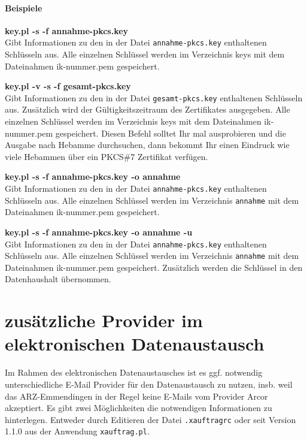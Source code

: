 \paragraph{Beispiele}
\begin{compactdesc}
\item
\textbf{key.pl -s -f annahme-pkcs.key}\\
Gibt Informationen zu den in der Datei \verb|annahme-pkcs.key| enthaltenen
Schlüsseln aus. Alle einzelnen Schlüssel werden im Verzeichnis keys mit
dem Dateinahmen ik-nummer.pem gespeichert.
\item
\textbf{key.pl -v -s -f gesamt-pkcs.key}\\
Gibt Informationen zu den in der Datei \verb|gesamt-pkcs.key| enthaltenen
Schlüsseln aus. Zusätzlich wird der Gültigkeitszeitraum des Zertifikates
ausgegeben. Alle einzelnen Schlüssel werden im Verzeichnis keys mit
dem Dateinahmen ik-nummer.pem gespeichert.
Diesen Befehl solltet Ihr mal ausprobieren und die Ausgabe nach Hebamme
durchsuchen, dann bekommt Ihr einen Eindruck wie viele Hebammen über ein
PKCS\#7 Zertifikat verfügen.
\item
\textbf{key.pl -s -f annahme-pkcs.key -o annahme}\\
Gibt Informationen zu den in der Datei \verb|annahme-pkcs.key| enthaltenen
Schlüsseln aus. Alle einzelnen Schlüssel werden im Verzeichnis \verb|annahme|
 mit dem Dateinahmen ik-nummer.pem gespeichert.
\item
\textbf{key.pl -s -f annahme-pkcs.key -o annahme -u}\\
Gibt Informationen zu den in der Datei \verb|annahme-pkcs.key| enthaltenen
Schlüsseln aus. Alle einzelnen Schlüssel werden im Verzeichnis \verb|annahme|
 mit dem Dateinahmen ik-nummer.pem gespeichert. Zusätzlich werden die
Schlüssel in den \tinyHeb\/ Datenhaushalt übernommen. 
\end{compactdesc}


\section{zusätzliche Provider im elektronischen Datenaustausch\label{anhang:provider}}
Im Rahmen des elektronischen Datenaustausches ist es ggf. notwendig
unterschiedliche E-Mail Provider für den Datenaustausch zu nutzen, insb.
weil das ARZ-Emmendingen in der Regel keine E-Mails vom Provider Arcor
akzeptiert.
Es gibt zwei Möglichkeiten die notwendigen Informationen zu hinterlegen.
Entweder durch Editieren der Datei \verb|.xauftragrc| oder
seit \tinyHeb\/ Version 1.1.0 aus der Anwendung \verb|xauftrag.pl|.

